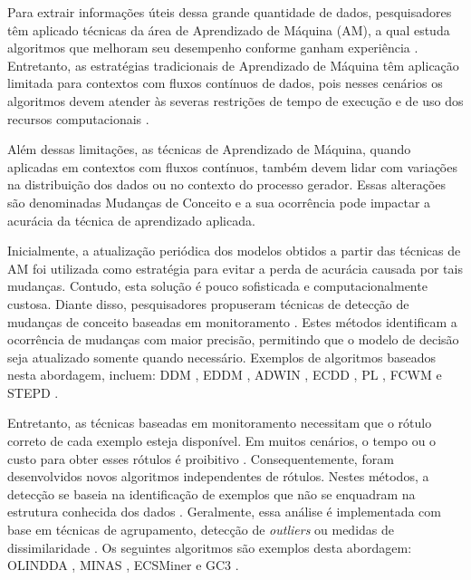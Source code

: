 \documentclass[msc, classic, a4paper]{ufbathesis}
\begin{document}
Para extrair informações úteis dessa grande quantidade de dados,
pesquisadores têm aplicado técnicas da área de Aprendizado de Máquina (AM),
a qual estuda algoritmos que melhoram seu desempenho conforme ganham experiência \cite{Mitchell:1997:ML:541177}.
%
Entretanto, as estratégias tradicionais de Aprendizado de Máquina têm aplicação limitada para contextos com fluxos contínuos de dados,
pois nesses cenários os algoritmos devem atender às severas restrições de tempo de execução e de uso dos recursos computacionais \cite{bifet2009data}.

Além dessas limitações,
as técnicas de Aprendizado de Máquina,
quando aplicadas em contextos com fluxos contínuos,
também devem lidar com variações na distribuição dos dados ou no contexto do processo gerador.
%
Essas alterações são denominadas Mudanças de Conceito \cite{Gama:2010:KDD:1855075} e
a sua ocorrência pode impactar a acurácia da técnica de aprendizado aplicada.

Inicialmente, a atualização periódica dos modelos obtidos a partir das técnicas de AM foi utilizada como estratégia para evitar a perda de acurácia causada por tais mudanças.
%
Contudo, esta solução é pouco sofisticada e computacionalmente custosa.
%
Diante disso, pesquisadores propuseram técnicas de detecção de mudanças de conceito baseadas em monitoramento \cite{Gama:2014:SCD:2597757.2523813}.
%
Estes métodos identificam a ocorrência de mudanças com maior precisão, permitindo que o modelo de decisão seja atualizado somente quando necessário.
%
Exemplos de algoritmos baseados nesta abordagem, incluem:
DDM \cite{GamaMCR04}, EDDM \cite{EDDM},
ADWIN \cite{BifetG07}, ECDD \cite{Ross:2012:EWM:2076039.2076307},
PL \cite{Bach:PL:2008}, FCWM \cite{FCWM} e STEPD \cite{STEPD}.

Entretanto, as técnicas baseadas em monitoramento necessitam que o rótulo correto de cada exemplo esteja disponível.
%
Em muitos cenários, o tempo ou o custo para obter esses rótulos é proibitivo \cite{Aggarwal:2006:DSM:1196418}.
%
Consequentemente, foram desenvolvidos novos algoritmos independentes de rótulos.
Nestes métodos, a detecção se baseia na identificação de exemplos que não se enquadram na estrutura conhecida dos dados \cite{Spinosa:2007:OCA:1244002.1244107}.
%
Geralmente, essa análise é implementada com base em técnicas de agrupamento, detecção de \textit{outliers} ou medidas de dissimilaridade \cite{Ryu:Kantardzic:2012}.
%
Os seguintes algoritmos são exemplos desta abordagem:
OLINDDA \cite{Spinosa:2007:OCA:1244002.1244107},
MINAS \cite{Faria:2013:NDA:2480362.2480515},
ECSMiner \cite{Masud:2011:CNC:1978259.1978529} e
GC3 \cite{Sethi2016b:GC3}.
\end{document}
